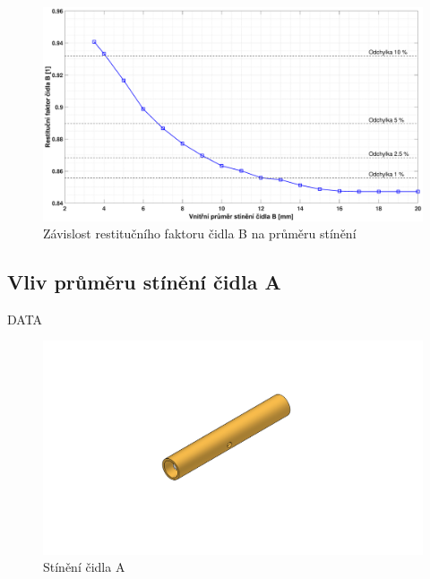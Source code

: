         
        \begin{figure}[ht!]
            \centering
            \includegraphics*[width=\textwidth, trim={5.9cm 1.0cm 5.8cm 2.0cm}]{400_SIMULACE_KONSTRUKCNICH_UPRAV/Grafy/04_prumer_stineni_B}
            \caption{Závislost restitučního faktoru čidla B na průměru stínění}
            \label{fig:prumer-stineni-B}
        \end{figure}
    
    \newpage
    \subsection{Vliv průměru stínění čidla A} \label{sec:stineni-A}
        DATA
        
        \begin{figure}[ht!]
            \centering
            \includegraphics[width=\textwidth]{400_SIMULACE_KONSTRUKCNICH_UPRAV/Vykresy_rendery/Stineni_A.png}
            \caption{Stínění čidla A}
            \label{fig:stineni-A}
        \end{figure}
        
